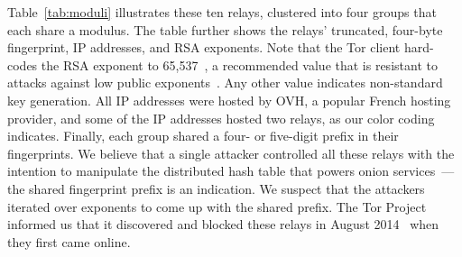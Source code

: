 Table~\ref{tab:moduli} illustrates these ten relays, clustered into four groups
that each share a modulus.  The table further shows the relays' truncated,
four-byte fingerprint, IP addresses, and RSA exponents.  Note that the Tor
client hard-codes the RSA exponent to 65,537~\cite[\S~0.3]{torspec}, a
recommended value that is resistant to attacks against low public
exponents~\cite[\S~4]{Boneh1999a}.  Any other value indicates non-standard key
generation.  All IP addresses were hosted by OVH, a popular French hosting
provider, and some of the IP addresses hosted two relays, as our color coding
indicates.  Finally, each group shared a four- or five-digit prefix in their
fingerprints.  We believe that a single attacker controlled all these relays
with the intention to manipulate the distributed hash table that powers onion
services~\cite{Biryukov2013a}---the shared fingerprint prefix is an indication.
We suspect that the attackers iterated over exponents to come up with the shared
prefix.  The Tor Project informed us that it discovered and blocked these relays
in August 2014~\cite{tor-priv1} when they first came online.

